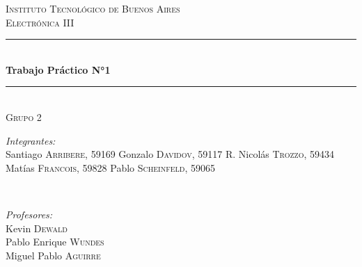 \begin{titlepage}

\newcommand{\HRule}{\rule{\linewidth}{0.5mm}} %

\center %
 

\textsc{\LARGE  Instituto Tecnológico de Buenos Aires}\\[1.5cm] %
\textsc{\large Electrónica III}\\[0.5cm] %


\HRule \\[0.4cm]
{ \huge \bfseries Trabajo Práctico N°1}\\[0.4cm] %
\HRule \\[1.5cm]
 \textsc{\large Grupo 2}\\[0.5cm] 

\begin{minipage}{0.5\textwidth}
\begin{flushleft} \large
\emph{Integrantes:}\\
Santiago \textsc{Arribere, 59169} \newline %
Gonzalo \textsc{Davidov, 59117}\newline
R. Nicolás \textsc{Trozzo, 59434}\newline
Matías \textsc{Francois, 59828}\newline
Pablo \textsc{Scheinfeld, 59065}

\end{flushleft}
\end{minipage}
~
\begin{minipage}{0.4\textwidth}
\begin{flushright} \large
\emph{Profesores:} \\
Kevin \textsc{Dewald}\\ %
Pablo Enrique \textsc{Wundes}\\
Miguel Pablo \textsc{Aguirre}
\end{flushright}
\end{minipage}\\[1cm]


\end{titlepage}

